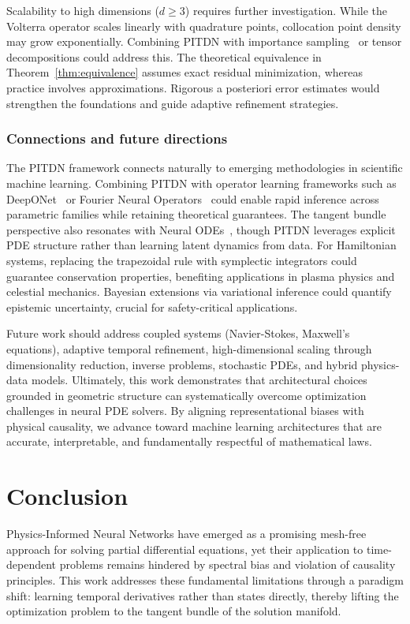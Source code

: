 \documentclass[11pt,reqno]{amsart}
\theoremstyle{plain}
\theoremstyle{definition}
\theoremstyle{remark}
\begin{document}
Scalability to high dimensions ($d \geq 3$) requires further investigation. While the Volterra operator scales linearly with quadrature points, collocation point density may grow exponentially. Combining PITDN with importance sampling~\cite{nabian2021efficient} or tensor decompositions could address this. The theoretical equivalence in Theorem~\ref{thm:equivalence} assumes exact residual minimization, whereas practice involves approximations. Rigorous a posteriori error estimates would strengthen the foundations and guide adaptive refinement strategies.

\subsubsection{Connections and future directions}

The PITDN framework connects naturally to emerging methodologies in scientific machine learning. Combining PITDN with operator learning frameworks such as DeepONet~\cite{lu2021deeponet} or Fourier Neural Operators~\cite{li2020fourier} could enable rapid inference across parametric families while retaining theoretical guarantees. The tangent bundle perspective also resonates 
with Neural ODEs~\cite{chen2018neural}, though PITDN leverages explicit PDE structure rather than learning latent dynamics from data. For Hamiltonian systems, replacing the trapezoidal rule with symplectic integrators could guarantee conservation properties, benefiting applications in plasma physics and celestial mechanics. Bayesian extensions via variational inference could quantify epistemic uncertainty, crucial for safety-critical applications.

Future work should address coupled systems (Navier-Stokes, Maxwell's equations), adaptive temporal refinement, high-dimensional scaling through dimensionality reduction, inverse problems, stochastic PDEs, and hybrid physics-data models. Ultimately, this work demonstrates that architectural choices grounded in geometric structure can systematically overcome optimization challenges in neural PDE solvers. By aligning representational biases with physical causality, we advance toward machine learning architectures that are accurate, 
interpretable, and fundamentally respectful of mathematical laws.


\section{Conclusion}

Physics-Informed Neural Networks have emerged as a promising mesh-free approach for solving partial differential equations, yet their application to time-dependent problems remains hindered by spectral bias and violation of causality principles. This work addresses these fundamental limitations through a paradigm shift: learning temporal derivatives rather than states directly, thereby lifting the optimization problem to the tangent bundle of the solution manifold.
\end{document}

